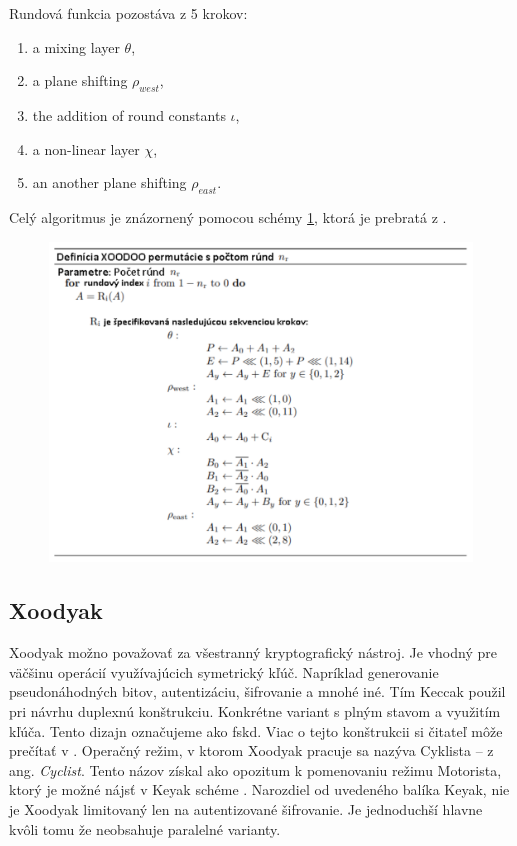 Rundová funkcia pozostáva z 5 krokov:
\begin{enumerate}
	\item a	mixing layer $\theta$, 
	\item a plane shifting $\rho_{west}$, 
	\item the addition of round constants $\iota$,
	\item a non-linear layer $\chi$,
	\item an another plane shifting $\rho_{east}$.
\end{enumerate}
Celý algoritmus je znázornený pomocou schémy \ref{xoodooalgo}, ktorá je prebratá z \cite{xcb}. 

  \begin{figure}[!h]
  	\centering
  	\includegraphics[width=1.1\textwidth]{figures/xoodooalgo}
  	\caption{}
  	\label{xoodooalgo}
  \end{figure}

\subsection{Xoodyak} 
Xoodyak možno považovať za všestranný kryptografický nástroj. Je vhodný pre väčšinu operácií využívajúcich symetrický kľúč. Napríklad generovanie pseudonáhodných bitov, autentizáciu, šifrovanie a mnohé iné. Tím Keccak použil pri návrhu duplexnú konštrukciu. Konkrétne variant s plným stavom a využitím kľúča. Tento dizajn označujeme ako \acrfull{fskd}. Viac o tejto konštrukcii si čitateľ môže prečítať v \cite{duplex}.
Operačný režim, v ktorom Xoodyak pracuje sa nazýva Cyklista -- z ang. \textit{Cyclist}. Tento názov získal ako opozitum k pomenovaniu režimu Motorista, ktorý je možné nájsť v Keyak schéme \cite{keyak}. Narozdiel od uvedeného balíka Keyak, nie je Xoodyak limitovaný len na autentizované šifrovanie. Je jednoduchší hlavne kvôli tomu že neobsahuje paralelné varianty.

